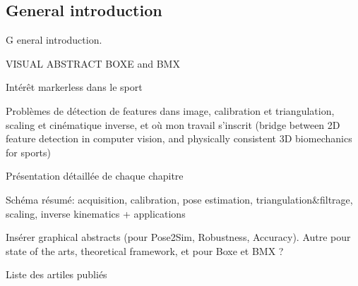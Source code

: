 {}

\vspace*{-1cm}
\begin{flushright}
\section*{\fontsize{20pt}{20pt}\selectfont\textnormal{General introduction}}
\end{flushright}
\vspace{2cm}

\chead[\fancyplain{}{}]
      {\fancyplain{}{}}
\lfoot[\fancyplain{}{}]%
      {\fancyplain{}{}}
\cfoot[\fancyplain{}{\thepage}]
      {\fancyplain{}{\thepage}}
\rfoot[\fancyplain{}{}]%
     {\fancyplain{}{\scriptsize}}
     


\lettrine[lines=1]{G}{ }eneral introduction.


VISUAL ABSTRACT BOXE and BMX



Intérêt markerless dans le sport

Problèmes de détection de features dans image, calibration et triangulation, scaling et cinématique inverse, et où mon travail s'inscrit (bridge between 2D feature detection in computer vision, and physically consistent 3D biomechanics for sports)

Présentation détaillée de chaque chapitre

Schéma résumé: acquisition, calibration, pose estimation, triangulation\&filtrage, scaling, inverse kinematics + applications

Insérer graphical abstracts (pour Pose2Sim, Robustness, Accuracy). Autre pour state of the arts, theoretical framework, et pour Boxe et BMX ?

Liste des artiles publiés



